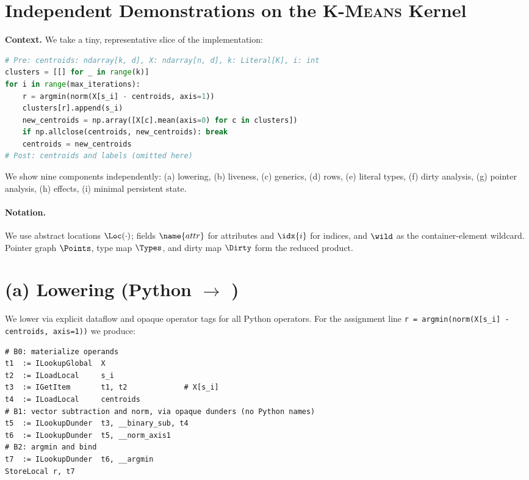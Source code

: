 \clearpage
\section{Independent Demonstrations on the \textsc{K-Means} Kernel}

\noindent \textbf{Context.}
We take a tiny, representative slice of the implementation:
\begin{lstlisting}[language=Python]
# Pre: centroids: ndarray[k, d], X: ndarray[n, d], k: Literal[K], i: int
clusters = [[] for _ in range(k)]
for i in range(max_iterations):
    r = argmin(norm(X[s_i] - centroids, axis=1))
    clusters[r].append(s_i)
    new_centroids = np.array([X[c].mean(axis=0) for c in clusters])
    if np.allclose(centroids, new_centroids): break
    centroids = new_centroids
# Post: centroids and labels (omitted here)
\end{lstlisting}
We show nine components independently: (a) lowering, (b) liveness, (c) generics,
(d) rows, (e) literal types, (f) dirty analysis, (g) pointer analysis, (h) effects, (i) minimal persistent state.

\paragraph{Notation.}
We use abstract locations $\Loc(\cdot)$; fields $\name{attr}$ for attributes and $\idx{i}$ for indices,
and $\wild$ as the container-element wildcard. Pointer graph $\Points$, type map $\Types$, and dirty map $\Dirty$ form the reduced product.

\section*{(a) Lowering (Python $\to$ \Spytecode)}
We lower via explicit dataflow and opaque operator tags for all Python operators.
For the assignment line \texttt{r = argmin(norm(X[s\_i] - centroids, axis=1))} we produce:
\begin{lstlisting}[language={}]
# B0: materialize operands
t1  := ILookupGlobal  X
t2  := ILoadLocal     s_i
t3  := IGetItem       t1, t2             # X[s_i]
t4  := ILoadLocal     centroids
# B1: vector subtraction and norm, via opaque dunders (no Python names)
t5  := ILookupDunder  t3, __binary_sub, t4
t6  := ILookupDunder  t5, __norm_axis1
# B2: argmin and bind
t7  := ILookupDunder  t6, __argmin
StoreLocal r, t7
\end{lstlisting}

